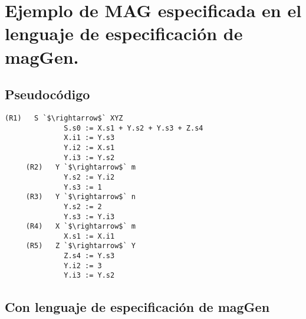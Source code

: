 \documentclass[runningheads,a4paper]{llncs}
\newcommand{\maggen}{\textbf{magGen}}
\begin{document}
\section{Ejemplo de MAG especificada en el lenguaje de especificación de \maggen.}
\label{ej:agwuuyang}

\subsection{Pseudocódigo}
\begin{lstlisting}[backgroundcolor=\color{white}]
     (R1)   S `$\rightarrow$` XYZ      
              S.s0 := X.s1 + Y.s2 + Y.s3 + Z.s4
              X.i1 := Y.s3  
              Y.i2 := X.s1
              Y.i3 := Y.s2
     (R2)   Y `$\rightarrow$` m        
              Y.s2 := Y.i2
              Y.s3 := 1
     (R3)   Y `$\rightarrow$` n        
              Y.s2 := 2
              Y.s3 := Y.i3
     (R4)   X `$\rightarrow$` m        
              X.s1 := X.i1
     (R5)   Z `$\rightarrow$` Y        
              Z.s4 := Y.s3
              Y.i2 := 3
              Y.i3 := Y.s2
\end{lstlisting} 

\subsection{Con lenguaje de especificación de \maggen}


\end{document}
